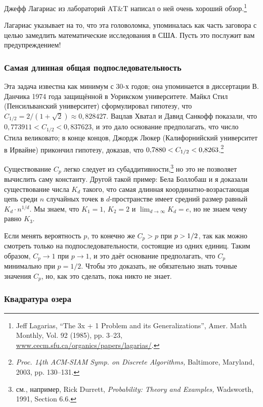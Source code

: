 Джефф Лагариас из лабораторий AT\&T написал о ней очень хороший обзор.\footnote{Jeff Lagarias, ``The 3x + 1 Problem and its Generalizations'', Amer. Math Monthly, Vol. 92 (1985), pp. 3--23, \href{http://www.cecm.sfu.ca/organics/papers/lagarias/}{www.cecm.sfu.ca/organics/papers/lagarias/}.}

Лагариас указывает на то, что эта головоломка, упоминалась как часть заговора с целью замедлить математические исследования в США.
Пусть это послужит вам предупреждением!

\subsubsection*{Самая длинная общая подпоследовательность}

Эта задача известна как минимум с 30-х годов; она упоминается в диссертации В. Данчика 1974 года защищённой в Уорикском университете.
Майкл Стил (Пенсильванский университет) сформулировал гипотезу, что $C_{1/2} = 2/(1+\sqrt{2})\approx 0{,}828427$.
Вацлав Хватал и Давид Санкофф показали, что $0{,}773911 < C_{1/2} < 0{,}837623$, и это дало основание предполагать, что число Стила великовато;
в конце концов, Джордж Люкер (Калифорнийский университет в Ирвайне) прикончил гипотезу, доказав, что $0{,}7880 \z< C_{1/2} \z< 0{,}8263$.\footnote{\textit{Proc. 14th ACM-SIAM Symp. on Discrete Algorithms,} Baltimore, Maryland, 2003, pp. 130--131.}

Существование $C_p$ легко следует из субаддитивности,\footnote{см., например, Rick Durrett, \textit{Probability: Theory and Examples,} Wadsworth, 1991, Section 6.6.} но это не позволяет вычислить саму константу.
Другой такой пример: Бела Боллобаш и я доказали существование числа $K_d$ такого, что самая длинная координатно-возрастающая цепь среди $n$ случайных точек в $d$-пространстве имеет средний размер равный $K_d\cdot n^{1/d}$.
Мы знаем, что $K_1=1$, $K_2=2$ и $\lim_{d\to\infty} K_d=e$, но не знаем чему равно $K_3$.

Если менять вероятность $p$, то конечно же $C_p>p$ при $p \z> 1/2$, так как можно смотреть только на подпоследовательности, состоящие из одних единиц.
Таким образом, $C_p\to 1$ при $p\to 1$, и это даёт основание предполагать, что $C_p$ минимально при $p=1/2$.
Чтобы это доказать, не обязательно знать точные значения $C_p$,
но, как это сделать, пока никто не знает.

\subsubsection*{Квадратура озера}

